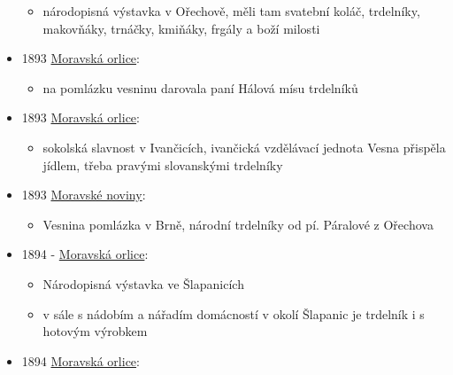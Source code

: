 \begin{itemize}
  \begin{itemize}
  \tightlist
  \item
    národopisná výstavka v Ořechově, měli tam svatební koláč, trdelníky,
    makovňáky, trnáčky, kmiňáky, frgály a boží milosti
  \end{itemize}
\item
  1893
  \href{https://ceskadigitalniknihovna.cz/view/uuid:04fd1c48-32f0-11de-992b-00145e5790ea?page=uuid:298ab776-32f0-11de-992b-00145e5790ea&fulltext=vaje\%C4\%8D*\%20trdel*&source=mzk}{Moravská
  orlice}:

  \begin{itemize}
  \tightlist
  \item
    na pomlázku vesninu darovala paní Hálová mísu trdelníků
  \end{itemize}
\item
  1893
  \href{https://ceskadigitalniknihovna.cz/view/uuid:04ff8d70-32f0-11de-992b-00145e5790ea?page=uuid:299cdfa7-32f0-11de-992b-00145e5790ea&fulltext=trdeln\%C3\%AD*&source=mzk}{Moravská
  orlice}:

  \begin{itemize}
  \tightlist
  \item
    sokolská slavnost v Ivančicích, ivančická vzdělávací jednota Vesna
    přispěla jídlem, třeba pravými slovanskými trdelníky
  \end{itemize}
\item
  1893
  \href{https://www.digitalniknihovna.cz/vkol/uuid/uuid:7584cb6d-4978-4820-9af6-7d206917db08}{Moravské
  noviny}:

  \begin{itemize}
  \tightlist
  \item
    Vesnina pomlázka v Brně, národní trdelníky od pí. Páralové z
    Ořechova
  \end{itemize}
\item
  1894 -
  \href{https://ndk.cz/view/uuid:04ec7ad2-32f0-11de-992b-00145e5790ea?page=uuid\%3A81b0ec10-3115-11e8-b257-005056825209&fulltext=trdeln\%C3\%ADk}{Moravská
  orlice}:

  \begin{itemize}
  \tightlist
  \item
    Národopisná výstavka ve Šlapanicích
  \item
    v sále s nádobím a nářadím domácností v okolí Šlapanic je trdelník i
    s hotovým výrobkem
  \end{itemize}
\item
  1894
  \href{https://ceskadigitalniknihovna.cz/view/uuid:04ecc8f4-32f0-11de-992b-00145e5790ea?page=uuid:2a2ac745-32f0-11de-992b-00145e5790ea&fulltext=trdeln\%C3\%AD*&source=mzk}{Moravská
  orlice}:


\end{itemize}
